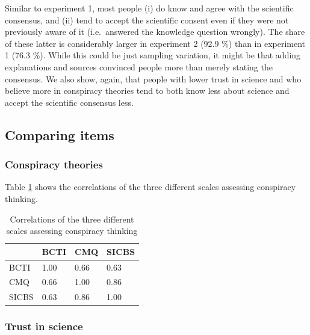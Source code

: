 \documentclass[
  doc,floatsintext]{apa6}
\begin{document}
Similar to experiment 1, most people (i) do know and agree with the scientific consensus, and (ii) tend to accept the scientific consent even if they were not previously aware of it (i.e.~answered the knowledge question wrongly). The share of these latter is considerably larger in experiment 2 (92.9 \%) than in experiment 1 (76.3 \%). While this could be just sampling variation, it might be that adding explanations and sources convinced people more than merely stating the consensus. We also show, again, that people with lower trust in science and who believe more in conspiracy theories tend to both know less about science and accept the scientific consensus less.

\subsection{Comparing items}\label{comparing-items-1}

\subsubsection{Conspiracy theories}\label{conspiracy-theories-1}

Table \ref{tab:exp2-correlation-conspiracy} shows the correlations of the three different scales assessing conspiracy thinking.

\begin{table}[h]

\begin{center}
\begin{threeparttable}

\caption{\label{tab:exp2-correlation-conspiracy}Correlations of the three different scales assessing conspiracy thinking}

\begin{tabular}{llll}
\toprule
 & \multicolumn{1}{c}{BCTI} & \multicolumn{1}{c}{CMQ} & \multicolumn{1}{c}{SICBS}\\
\midrule
BCTI & 1.00 & 0.66 & 0.63\\
CMQ & 0.66 & 1.00 & 0.86\\
SICBS & 0.63 & 0.86 & 1.00\\
\bottomrule
\end{tabular}

\end{threeparttable}
\end{center}

\end{table}

\subsubsection{Trust in science}\label{trust-in-science-5}
\end{document}
